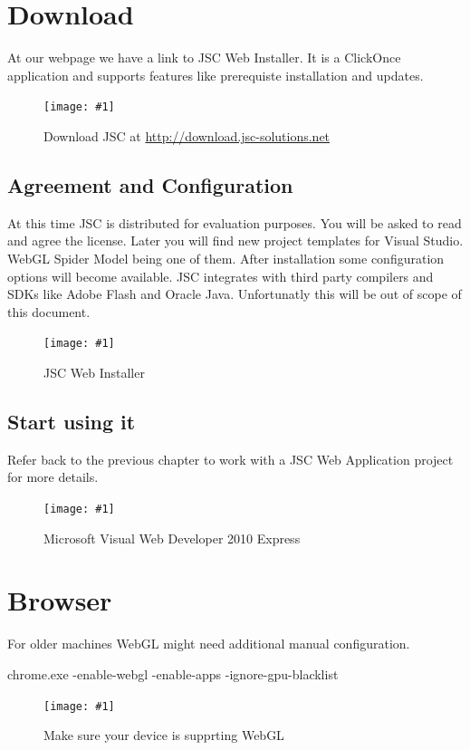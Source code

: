 \documentclass[12pt,leqno]{book}
\newcommand{\png}[1]{\texttt{[image: \#1]}}
\newcommand{\figpng}[2]{\begin{figure}[htb]\centering\png{#1}\caption{#2}\end{figure}}
\begin{document}
\section{Download}
At our webpage we have a link to JSC Web Installer. It is a ClickOnce application and supports features like prerequiste installation and updates.

\figpng{Images/jsc_-_Google_Chrome-2012-03-14_14.33.04}
{Download JSC at \url{http://download.jsc-solutions.net}}

\subsection{Agreement and Configuration}
At this time JSC is distributed for evaluation purposes. You will be asked to read and agree the license. Later you will find new project templates for Visual Studio. WebGL Spider Model being one of them. After installation some configuration options will become available. JSC integrates with third party compilers and SDKs like Adobe Flash and Oracle Java. Unfortunatly this will be out of scope of this document. 

\figpng{Images/jsc-2012-03-14_14.45.41}
{JSC Web Installer}

\subsection{Start using it}
Refer back to the previous chapter to work with a JSC Web Application project for more details.

\figpng{Images/SpiderModel_-_Microsoft_Visual_Web_Developer_2010_Express-2012-03-15_08.34.00}
{Microsoft Visual Web Developer 2010 Express}





\section{Browser}

For older machines WebGL might need additional manual configuration.

\begin{framed}
chrome.exe -enable-webgl -enable-apps -ignore-gpu-blacklist
\end{framed}

\figpng{Images/aboutgpu_-_Google_Chrome-2012-03-14_17.56.30}
{Make sure your device is supprting WebGL}
\end{document}
